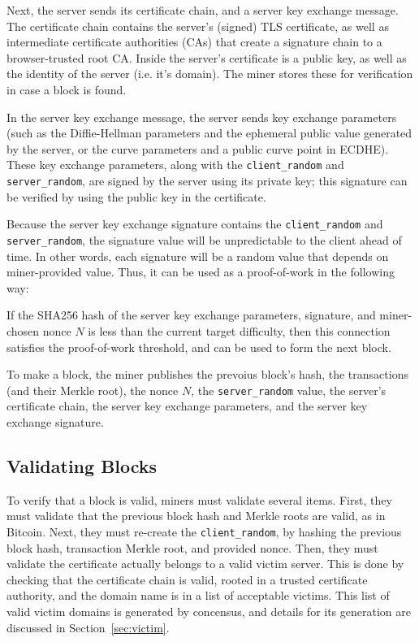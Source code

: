 Next, the server sends its certificate chain, and a server key exchange message.
The certificate chain contains the server's (signed) TLS certificate, as well as
intermediate certificate authorities (CAs) that create a signature chain to a
browser-trusted root CA. Inside the server's certificate is a public
key, as well as the identity of the server (i.e. it's domain). The miner stores
these for verification in case a block is found.

In the server key exchange message, the server sends key exchange parameters
(such as the Diffie-Hellman parameters and the ephemeral public value generated
by the server, or the curve parameters and a public curve point in ECDHE). These
key exchange parameters, along with the \texttt{client\_random} and
\texttt{server\_random},  are signed by the server using its private key; this
signature can be verified by using the public key in the certificate.

Because the server key exchange signature contains the \texttt{client\_random}
and \texttt{server\_random}, the signature value will be unpredictable to the
client ahead of time. In other words, each signature will be a random value that
depends on miner-provided value. Thus, it can be used as a proof-of-work in the
following way:

If the SHA256 hash of the server key exchange parameters, signature, and
miner-chosen nonce $N$ is less than the current target difficulty, then this
connection satisfies the proof-of-work threshold, and can be used to form the
next block.

To make a block, the miner publishes the prevoius block's hash, the transactions
(and their Merkle root), the nonce $N$, the \texttt{server\_random} value, the
server's certificate chain, the server key exchange parameters, and the server
key exchange signature.

\subsection{Validating Blocks}

To verify that a block is valid, miners must validate several items. First, they
must validate that the previous block hash and Merkle roots are valid, as in
Bitcoin. Next, they must re-create the \texttt{client\_random}, by hashing the
previous block hash, transaction Merkle root, and provided nonce. Then, they
must validate the certificate actually belongs to a valid victim server. This is
done by checking that the certificate chain is valid, rooted in a trusted
certificate authority, and the domain name is in a list of acceptable victims.
This list of valid victim domains is generated by concensus, and details for its
generation are discussed in Section~\ref{sec:victim}.

